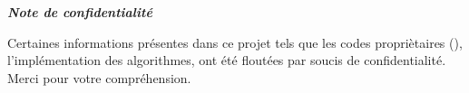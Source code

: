 \thispagestyle{empty}
\vspace*{2cm}
\begin{center}
    \huge{\textbf{\textit{Note de confidentialité}}}
\end{center}
\bigskip
\medskip 
\vspace{2cm}
\begin{center}
\large{
Certaines informations présentes dans ce projet tels que les codes propriètaires (), l'implémentation des algorithmes,  ont été floutées par soucis de confidentialité. Merci pour votre compréhension.
}
\end{center}



\clearpage
